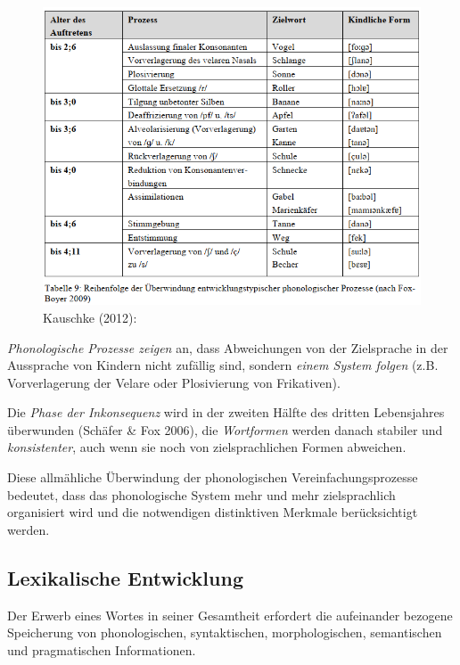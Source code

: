 \documentclass[
  letterpaper,
]{scrbook}
\begin{document}
\begin{figure}

{\centering \includegraphics[width=1\textwidth,height=\textheight]{./pictures/L1_Entwicklung_kauschke_Tab9.png}

}

\caption{Kauschke (2012):}

\end{figure}

\emph{Phonologische Prozesse zeigen} an, dass Abweichungen von der
Zielsprache in der Aussprache von Kindern nicht zufällig sind, sondern
\emph{einem System folgen} (z.B. Vorverlagerung der Velare oder
Plosivierung von Frikativen).

Die \emph{Phase der Inkonsequenz} wird in der zweiten Hälfte des dritten
Lebensjahres überwunden (Schäfer \& Fox 2006), die \emph{Wortformen}
werden danach stabiler und \emph{konsistenter}, auch wenn sie noch von
zielsprachlichen Formen abweichen.

Diese allmähliche Überwindung der phonologischen Vereinfachungsprozesse
bedeutet, dass das phonologische System mehr und mehr zielsprachlich
organisiert wird und die notwendigen distinktiven Merkmale
berücksichtigt werden.

\hypertarget{lexikalische-entwicklung}{%
\subsection{Lexikalische Entwicklung}\label{lexikalische-entwicklung}}

Der Erwerb eines Wortes in seiner Gesamtheit erfordert die aufeinander
bezogene Speicherung von phonologischen, syntaktischen, morphologischen,
semantischen und pragmatischen Informationen.
\end{document}

